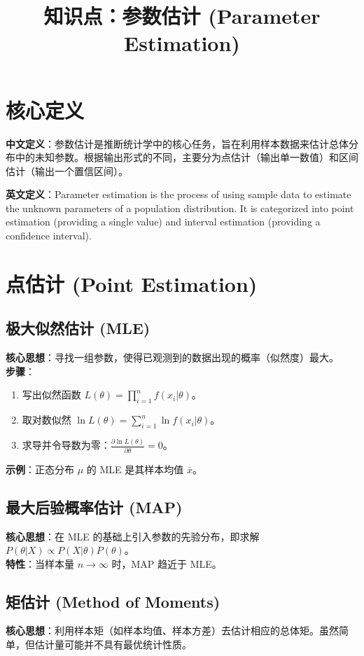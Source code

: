 \documentclass[12pt, a4paper]{article}
\title{知识点：参数估计 (Parameter Estimation)}
\author{}
\date{}
\begin{document}
\maketitle

\section{核心定义}
\textbf{中文定义}：参数估计是推断统计学中的核心任务，旨在利用样本数据来估计总体分布中的未知参数。根据输出形式的不同，主要分为点估计（输出单一数值）和区间估计（输出一个置信区间）。

\textbf{英文定义}：Parameter estimation is the process of using sample data to estimate the unknown parameters of a population distribution. It is categorized into point estimation (providing a single value) and interval estimation (providing a confidence interval).

\section{点估计 (Point Estimation)}

\subsection{极大似然估计 (MLE)}
\textbf{核心思想}：寻找一组参数，使得已观测到的数据出现的概率（似然度）最大。
\\ \textbf{步骤}：
\begin{enumerate}
    \item 写出似然函数 $L(\theta) = \prod_{i=1}^n f(x_i|\theta)$。
    \item 取对数似然 $\ln L(\theta) = \sum_{i=1}^n \ln f(x_i|\theta)$。
    \item 求导并令导数为零：$\frac{\partial \ln L(\theta)}{\partial \theta} = 0$。
\end{enumerate}
\textbf{示例}：正态分布 $\mu$ 的 MLE 是其样本均值 $\bar{x}$。

\subsection{最大后验概率估计 (MAP)}
\textbf{核心思想}：在 MLE 的基础上引入参数的先验分布，即求解 $P(\theta|X) \propto P(X|\theta)P(\theta)$。
\\ \textbf{特性}：当样本量 $n \to \infty$ 时，MAP 趋近于 MLE。

\subsection{矩估计 (Method of Moments)}
\textbf{核心思想}：利用样本矩（如样本均值、样本方差）去估计相应的总体矩。虽然简单，但估计量可能并不具有最优统计性质。
\end{document}
